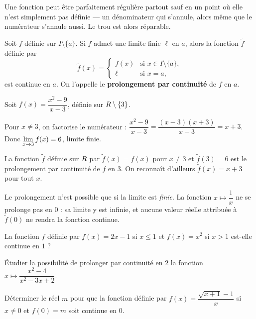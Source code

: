 Une fonction peut être parfaitement régulière partout sauf en un point où elle
n'est simplement pas définie — un dénominateur qui s'annule, alors même que le
numérateur s'annule aussi. Le trou est alors réparable.

\begin{definition}
Soit $f$ définie sur $I \setminus \{a\}$. Si $f$ admet une limite finie $\ell$
en $a$, alors la fonction $\tilde{f}$ définie par
\[
  \tilde{f}(x) =
  \begin{cases}
    f(x) & \text{si } x \in I \setminus \{a\}, \\[0.3em]
    \ell & \text{si } x = a,
  \end{cases}
\]
est continue en $a$. On l'appelle le \textbf{prolongement par continuité} de
$f$ en $a$.
\end{definition}

\begin{exemple}
Soit $f(x) = \dfrac{x^{2}-9}{x-3}$, définie sur $R \setminus \{3\}$.

Pour $x \neq 3$, on factorise le numérateur :
$\dfrac{x^{2}-9}{x-3} = \dfrac{(x-3)(x+3)}{x-3} = x+3$.
Donc $\limx{3} f(x) = 6$, limite finie.

La fonction $\tilde{f}$ définie sur $R$ par $\tilde{f}(x) = f(x)$ pour
$x \neq 3$ et $\tilde{f}(3) = 6$ est le prolongement par continuité de $f$
en $3$. On reconnaît d'ailleurs $\tilde{f}(x) = x+3$ pour tout $x$.
\end{exemple}

\begin{avertissement}
Le prolongement n'est possible que si la limite est \emph{finie}. La fonction
$x \mapsto \dfrac{1}{x}$ ne se prolonge pas en $0$ : sa limite y est infinie,
et aucune valeur réelle attribuée à $\tilde{f}(0)$ ne rendra la fonction
continue.
\end{avertissement}

\begin{entrainement}
\exo[\niveau{1}] La fonction $f$ définie par $f(x) = 2x - 1$ si $x \leq 1$ et
$f(x) = x^{2}$ si $x > 1$ est-elle continue en $1$ ?

\exo[\niveau{2}] Étudier la possibilité de prolonger par continuité en $2$ la
fonction $x \mapsto \dfrac{x^{2}-4}{x^{2}-3x+2}$.

\exo[\niveau{3}] Déterminer le réel $m$ pour que la fonction définie par
$f(x) = \dfrac{\sqrt{x+1}-1}{x}$ si $x \neq 0$ et $f(0) = m$ soit continue
en $0$.
\end{entrainement}

